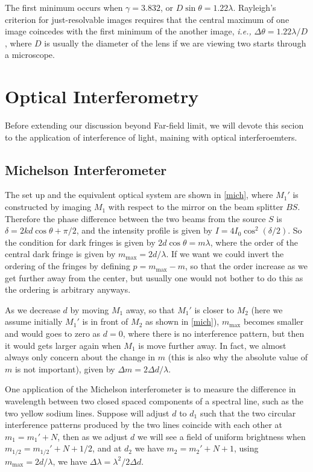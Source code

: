 \documentclass[english,a4paper,12pt]{report}
\begin{document}

The first minimum occurs when \(\gamma = 3.832\), or \(D \sin \theta = 1.22 \lambda\). Rayleigh's criterion for just-resolvable images requires that the central maximum of one image coincedes with the first minimum of the another image, \textit{i.e.,} \(\Delta \theta = 1.22 \lambda /D\), where \(D\) is usually the diameter of the lens if we are viewing two starts through a microscope.   

\section{Optical Interferometry}

Before extending our discussion beyond Far-field limit, we will devote this secion to the application of interference of light, maining with optical interferoemters.

\subsection{Michelson Interferometer}

The set up and the equivalent optical system are shown in \cref{mich}, where \(M_1 '\) is constructed by imaging \(M_1 \) with respect to the mirror on the beam splitter \(BS\). Therefore the phase difference between the two beams from the source \(S\) is \(\delta  = 2kd \cos \theta + \pi /2\), and the intensity profile is given by \(I = 4I_0  \cos ^2( \delta /2)\). So the condition for dark fringes is given by \(2d \cos \theta = m\lambda \), where the order of the central dark fringe is given by \(m_{\text{max} }= 2d /\lambda \). If we want we could invert the ordering of the fringes by defining \(p = m_{\text{max} } - m \), so that the order increase as we get further away from the center, but usually one would not bother to do this as the ordering is arbitrary anyways. 

As we decrease \(d\) by moving \(M_1 \) away, so that \(M_1 '\) is closer to \(M_2 \) (here we assume initially \(M_1 '\) is in front of \(M_2 \) as shown in \cref{mich}), \(m_{\text{max} } \) becomes smaller and would goes to zero as \(d = 0\), where there is no interference pattern, but then it would gets larger again when \(M_1 \) is move further away. In fact, we almost always only concern about the change in \(m\) (this is also why the absolute value of \(m\) is not important), given by \(\Delta m = 2 \Delta d/\lambda \).

One application of the Michelson interferometer is to measure the difference in wavelength between two closed spaced components of a spectral line, such as the two yellow sodium lines. Suppose will adjust \(d\) to \(d_1 \) such that the two circular interference patterns produced by the two lines coincide with each other at \(m_1  = m_1 ' + N\), then as we adjust \(d\) we will see a field of uniform brightness when \(m_{1/2}   = m_{1/2}  ' + N + 1/2 \), and at \(d_2 \) we have \(m_2  = m_2 ' + N + 1\), using \(m_{\text{max} } = 2d /\lambda  \), we have \(\Delta \lambda = \lambda ^2 /2\Delta d\). 
\end{document}
